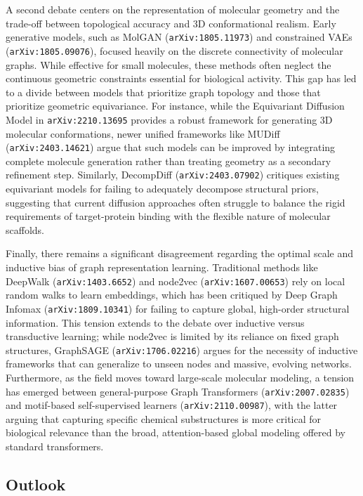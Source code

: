 \documentclass[11pt]{article}
\begin{document}
A second debate centers on the representation of molecular geometry and the trade-off between topological accuracy and 3D conformational realism. Early generative models, such as MolGAN (\texttt{arXiv:1805.11973}) and constrained VAEs (\texttt{arXiv:1805.09076}), focused heavily on the discrete connectivity of molecular graphs. While effective for small molecules, these methods often neglect the continuous geometric constraints essential for biological activity. This gap has led to a divide between models that prioritize graph topology and those that prioritize geometric equivariance. For instance, while the Equivariant Diffusion Model in \texttt{arXiv:2210.13695} provides a robust framework for generating 3D molecular conformations, newer unified frameworks like MUDiff (\texttt{arXiv:2403.14621}) argue that such models can be improved by integrating complete molecule generation rather than treating geometry as a secondary refinement step. Similarly, DecompDiff (\texttt{arXiv:2403.07902}) critiques existing equivariant models for failing to adequately decompose structural priors, suggesting that current diffusion approaches often struggle to balance the rigid requirements of target-protein binding with the flexible nature of molecular scaffolds.

Finally, there remains a significant disagreement regarding the optimal scale and inductive bias of graph representation learning. Traditional methods like DeepWalk (\texttt{arXiv:1403.6652}) and node2vec (\texttt{arXiv:1607.00653}) rely on local random walks to learn embeddings, which has been critiqued by Deep Graph Infomax (\texttt{arXiv:1809.10341}) for failing to capture global, high-order structural information. This tension extends to the debate over inductive versus transductive learning; while node2vec is limited by its reliance on fixed graph structures, GraphSAGE (\texttt{arXiv:1706.02216}) argues for the necessity of inductive frameworks that can generalize to unseen nodes and massive, evolving networks. Furthermore, as the field moves toward large-scale molecular modeling, a tension has emerged between general-purpose Graph Transformers (\texttt{arXiv:2007.02835}) and motif-based self-supervised learners (\texttt{arXiv:2110.00987}), with the latter arguing that capturing specific chemical substructures is more critical for biological relevance than the broad, attention-based global modeling offered by standard transformers.

\subsection{Outlook}
\end{document}
